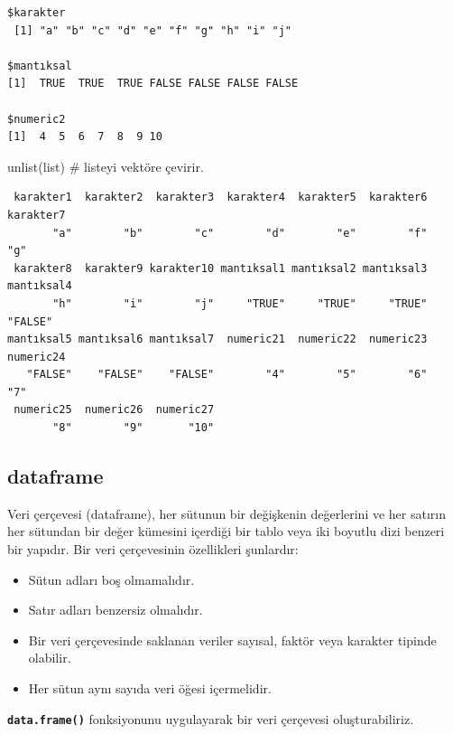 \documentclass[
  letterpaper,
  DIV=11,
  numbers=noendperiod]{scrreprt}
\newenvironment{Shaded}{\begin{snugshade}}{\end{snugshade}}
\newcommand{\CommentTok}[1]{\textcolor[rgb]{0.37,0.37,0.37}{#1}}
\newcommand{\FunctionTok}[1]{\textcolor[rgb]{0.28,0.35,0.67}{#1}}
\newcommand{\NormalTok}[1]{\textcolor[rgb]{0.00,0.23,0.31}{#1}}
\begin{document}
\begin{verbatim}
$karakter
 [1] "a" "b" "c" "d" "e" "f" "g" "h" "i" "j"

$mantıksal
[1]  TRUE  TRUE  TRUE FALSE FALSE FALSE FALSE

$numeric2
[1]  4  5  6  7  8  9 10
\end{verbatim}

\begin{Shaded}
\begin{Highlighting}[]
\FunctionTok{unlist}\NormalTok{(list) }\CommentTok{\# listeyi vektöre çevirir.}
\end{Highlighting}
\end{Shaded}

\begin{verbatim}
 karakter1  karakter2  karakter3  karakter4  karakter5  karakter6  karakter7 
       "a"        "b"        "c"        "d"        "e"        "f"        "g" 
 karakter8  karakter9 karakter10 mantıksal1 mantıksal2 mantıksal3 mantıksal4 
       "h"        "i"        "j"     "TRUE"     "TRUE"     "TRUE"    "FALSE" 
mantıksal5 mantıksal6 mantıksal7  numeric21  numeric22  numeric23  numeric24 
   "FALSE"    "FALSE"    "FALSE"        "4"        "5"        "6"        "7" 
 numeric25  numeric26  numeric27 
       "8"        "9"       "10" 
\end{verbatim}

\subsection{dataframe}\label{dataframe}

Veri çerçevesi (dataframe), her sütunun bir değişkenin değerlerini ve
her satırın her sütundan bir değer kümesini içerdiği bir tablo veya iki
boyutlu dizi benzeri bir yapıdır. Bir veri çerçevesinin özellikleri
şunlardır:

\begin{itemize}
\item
  Sütun adları boş olmamalıdır.
\item
  Satır adları benzersiz olmalıdır.
\item
  Bir veri çerçevesinde saklanan veriler sayısal, faktör veya karakter
  tipinde olabilir.
\item
  Her sütun aynı sayıda veri öğesi içermelidir.
\end{itemize}

\textbf{\texttt{data.frame()}} fonksiyonunu uygulayarak bir veri
çerçevesi oluşturabiliriz.
\end{document}
